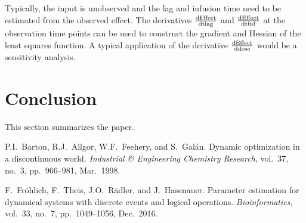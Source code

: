 \documentclass[journal, a4paper]{IEEEtran}
\begin{document}
Typically, the input is unobserved and the lag and infusion time need to be estimated from the observed effect. The derivatives $\frac{\rm dEffect}{\rm dtlag}$ and $\frac{\rm dEffect}{\rm dtinf}$ at the observation time points can be used to construct the gradient and Hessian of the least squares function. A typical application of the derivative $\frac{\rm dEffect}{\rm ddose}$ would be a sensitivity analysis.



\section{Conclusion}
	This section summarizes the paper.

\begin{thebibliography}{9}

	P.I.~Barton, R.J.~Allgor, W.F.~Feehery, and S.~Galán. Dynamic optimization in a discontinuous world. {\em Industrial \& Engineering Chemistry Research}, vol.~37, no.~3, pp.~966--981, Mar.~1998.
	
	F.~Fr{\"o}hlich, F.~Theis, J.O.~R{\"a}dler, and J.~Hasenauer. Parameter estimation for dynamical systems with discrete events and logical operations. {\em Bioinformatics}, vol.~33, no.~7, pp.~1049--1056, Dec.~2016.
	
	
\end{thebibliography}

\end{document}
